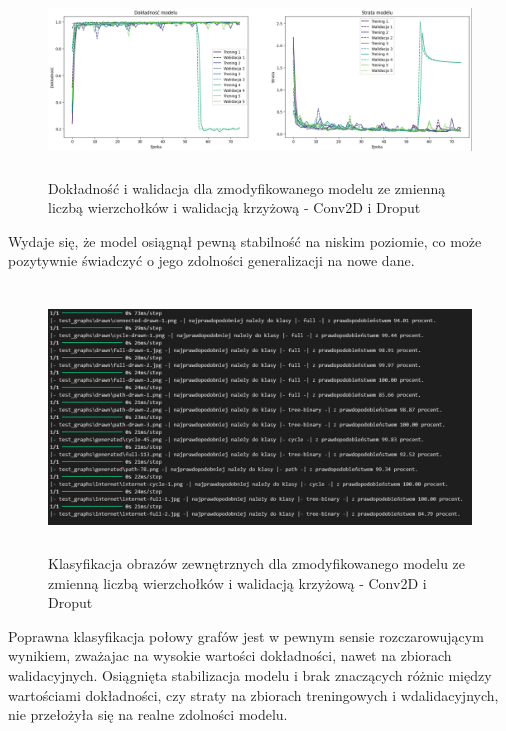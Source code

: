\begin{figure}[ht]
	\centering
	\includegraphics[height=5cm]{resources/tests/images/v4/multiple_edges_crossvalid_1_img.png}
	\caption{Dokładność i walidacja dla zmodyfikowanego modelu ze zmienną liczbą wierzchołków i walidacją krzyżową - Conv2D i Droput}
	\label{Fig:tests-csvar-1a}
\end{figure}
\FloatBarrier

Wydaje się, że model osiągnął pewną stabilność na niskim poziomie, co może pozytywnie świadczyć o jego zdolności generalizacji na nowe dane.

\begin{figure}[ht]
	\centering
	\includegraphics[height=7cm]{resources/tests/images/v4/multiple_edges_crossvalid_1_txt.png}
	\caption{Klasyfikacja obrazów zewnętrznych dla zmodyfikowanego modelu ze zmienną liczbą wierzchołków i walidacją krzyżową - Conv2D i Droput}
	\label{Fig:tests-csvar-1b}
\end{figure}
\FloatBarrier

Poprawna klasyfikacja połowy grafów jest w pewnym sensie rozczarowującym wynikiem,
zważajac na wysokie wartości dokładności, nawet na zbiorach walidacyjnych.
Osiągnięta stabilizacja modelu i brak znaczących różnic między wartościami dokładności,
czy straty na zbiorach treningowych i wdalidacyjnych, nie przełożyła się na realne zdolności modelu.

